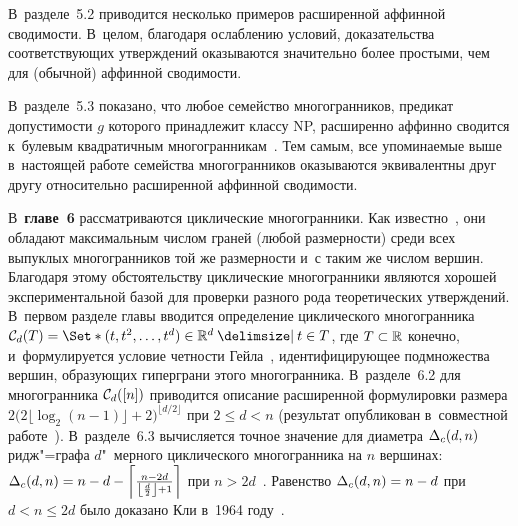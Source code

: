 В~разделе~5.2 приводится несколько примеров расширенной аффинной сводимости. В~целом, благодаря ослаблению условий, доказательства соответствующих утверждений оказываются значительно более простыми, чем для (обычной) аффинной сводимости.

В~разделе~5.3 показано, что любое семейство многогранников, предикат допустимости $g$ которого принадлежит классу NP, расширенно аффинно сводится к~булевым квадратичным многогранникам~.
Тем самым, все упоминаемые выше в~настоящей работе семейства многогранников оказываются эквивалентны друг другу относительно расширенной аффинной сводимости.



В~\textbf{главе~6} рассматриваются циклические многогранники.
Как известно~\cite{McMullen:1970}, они обладают максимальным числом граней (любой размерности) среди всех выпуклых многогранников той же размерности и~с таким же числом вершин.
Благодаря этому обстоятельству циклические многогранники являются хорошей экспериментальной базой для проверки разного рода теоретических утверждений.
В~первом разделе главы вводится определение циклического многогранника 
\(\CP_d(T) = \Set*{(t, t^2, \dots, t^d) \in \R^d \given t \in T}\), где $T \subset \mathbb{R}$ конечно,
и~формулируется условие четности Гейла~\cite{Gale:1963}, идентифицирующее подмножества вершин, образующих гиперграни этого многогранника.
В~разделе~6.2 для многогранника ${\mathcal C}_d([n])$ приводится описание расширенной формулировки размера $2\bigl(2\lfloor \log_2(n-1)\rfloor+2\bigr)^{\lfloor d/2 \rfloor}$ при $2 \le d < n$ (результат опубликован в~совместной работе~).
В~разделе~6.3 вычисляется точное значение для диаметра ${\Delta_{c}(d,n)}$ ридж"=графа $d$"~мерного циклического многогранника на $n$ вершинах:
\({\Delta_{c}(d,n)}= n-d  - 
\left\lceil 
\frac{n-2d}{ \left\lfloor \frac d 2 \right\rfloor+1}
\right\rceil\)
при $n > 2d$~. 
Равенство ${\Delta_{c}(d,n)}= n-d$ при $d < n \le 2d$  было доказано Кли в~1964 году~\cite{Klee:1964}.



